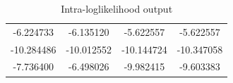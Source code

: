 \documentclass{beamer}
\begin{document}
\begin{frame}
\frametitle{}
\begin{table}[h!]
\caption{Intra-loglikelihood output} %
\centering
\begin{tabular}{c c c c} %
\hline %
   -6.224733 &  -6.135120 & -5.622557 & -5.622557\\
 -10.284486 &-10.012552 &-10.144724 &-10.347058\\  
-7.736400 & -6.498026 &  -9.982415 & -9.603383\\
\hline %
\end{tabular}
\end{table}




\end{frame}
\end{document}
